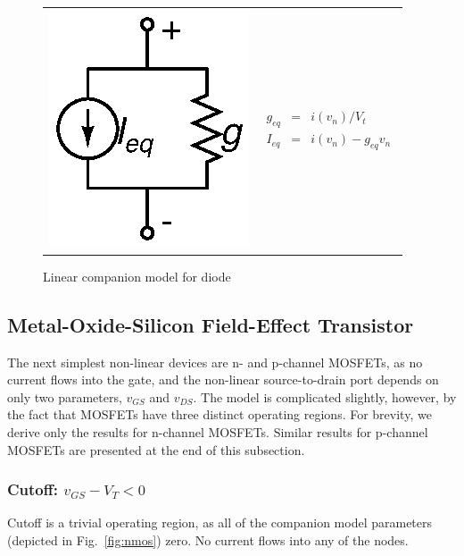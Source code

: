 \documentclass{article}
\begin{document}
\begin{figure}[h]
\begin{center}
\begin{tabular}{m{3cm}<{\centering}m{3cm}<{\centering}}
	\includegraphics{fig/diode.eps} & 
	\begin{eqnarray*}
		g_{eq}&=&i(v_n)/V_t \\
		I_{eq}&=&i(v_n)-g_{eq}v_n
	\end{eqnarray*}
\end{tabular}
\caption{Linear companion model for diode \label{fig:diode}}
\end{center}
\end{figure}

\pagebreak

\subsection{Metal-Oxide-Silicon Field-Effect Transistor}

The next simplest non-linear devices are n- and p-channel MOSFETs, as no current flows into the gate, and the non-linear source-to-drain port depends on only two parameters, $v_{GS}$ and $v_{DS}$.   The model is complicated slightly, however, by the fact that MOSFETs have three distinct operating regions.  For brevity, we derive only the results for n-channel MOSFETs.  Similar results for p-channel MOSFETs are presented at the end of this subsection.

\subsubsection{Cutoff: $ v_{GS} - V_T < 0 $ }

Cutoff is a trivial operating region, as all of the companion model parameters (depicted in Fig.~\ref{fig:nmos}) zero.  No current flows into any of the nodes.
\end{document}
